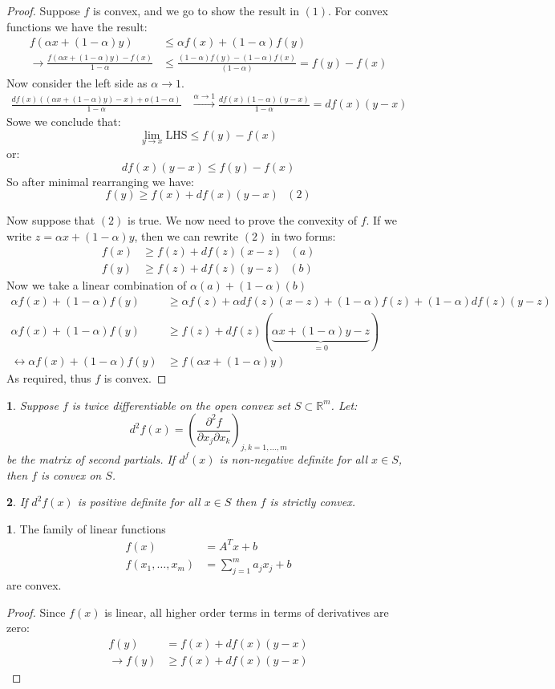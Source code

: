 \documentclass[english,12pt]{article}
\theoremstyle{plain}
\newtheorem*{proposition}{\protect\propositionname}
\theoremstyle{definition}
\newtheorem*{example}{\protect\examplename}
\theoremstyle{definition} %
\newcommand{\prop}[1]{\begin{proposition} #1 \end{proposition} }
\newcommand{\eg}[1]{\begin{example} #1 \end{example} }
\newcommand{\prf}[1]{\begin{proof} #1 \end{proof} }
\providecommand{\propositionname}{Proposition}
\providecommand{\examplename}{Example}
\newcommand{\brac}[1]{\left(#1\right)} %
\newcommand{\R}{\mathbb{R}} %
\begin{document}
\prf{
Suppose $f$ is convex, and we go to show the result in $(1)$.  For convex functions we have the result:
\begin{align*}
f(\alpha x+(1-\alpha)y)&\le\alpha f(x)+(1-\alpha)f(y)\\
\rightarrow \frac{f(\alpha x+(1-\alpha)y)-f(x)}{1-\alpha}&\le \frac{(1-\alpha)f(y)-(1-\alpha)f(x)}{(1-\alpha)}=f(y)-f(x)
\end{align*}
Now consider the left side as $\alpha\rightarrow 1$.
\begin{align*}
\frac{df(x)((\alpha x+(1-\alpha)y)-x)+o(1-\alpha)}{1-\alpha}&\xrightarrow{\alpha\rightarrow 1} \frac{df(x)(1-\alpha)(y-x)}{1-\alpha}
=df(x)(y-x)
\end{align*}
Sowe we conclude that:
\[\lim\limits_{y\to x}\text{LHS}\le f(y)-f(x)\]
or:
\[df(x)(y-x)\le f(y)-f(x)\]
So after minimal rearranging we have:
\[f(y)\ge f(x)+df(x)(y-x)\text{ }(2)\]

Now suppose that $(2)$ is true.  We now need to prove the convexity of $f$.  If we write $z=\alpha x+(1-\alpha)y$, then we can rewrite $(2)$ in two forms:
\begin{align*}
f(x)&\ge f(z)+df(z)(x-z)\text{ }(a)\\
f(y)&\ge f(z)+df(z)(y-z)\text{ }(b)
\end{align*}
Now we take a linear combination of $\alpha(a)+(1-\alpha)(b)$
\begin{align*}
\alpha f(x)+(1-\alpha)f(y)&\ge \alpha f(z)+\alpha df(z)(x-z)+(1-\alpha)f(z)+(1-\alpha)df(z)(y-z)\\
\alpha f(x)+(1-\alpha)f(y)&\ge f(z)+df(z)(\underbrace{\alpha x+(1-\alpha)y-z}_{=0})\\
\leftrightarrow \alpha f(x)+(1-\alpha)f(y)&\ge f(\alpha x+(1-\alpha)y)
\end{align*}
As required, thus $f$ is convex.
}

\prop{
Suppose $f$ is twice differentiable on the open convex set $S\subset\R^m$.  Let:
\[d^2f(x)=\brac{\frac{\partial^2 f}{\partial x_j\partial x_k}}_{j,k=1,\ldots,m}\]
be the matrix of second partials.  If $d^f(x)$ is non-negative definite for all $x\in S$, then $f$ is convex on $S$.
}

\prop{
If $d^2f(x)$ is positive definite for all $x\in S$ then $f$ is strictly convex.
}

\eg{
The family of linear functions 
\begin{align*}
f(x)&=A^Tx+b\\
f(x_1,\ldots,x_m)&=\sum\limits_{j=1}^ma_jx_j+b
\end{align*}
are convex.
\prf{
Since $f(x)$ is linear, all higher order terms in terms of derivatives are zero:
\begin{align*}
f(y)&=f(x)+df(x)(y-x)\\
\rightarrow f(y)&\ge f(x)+df(x)(y-x)
\end{align*}
}
}
\end{document}
